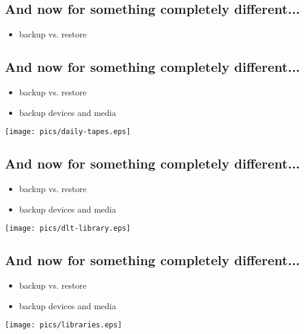 \documentclass[xga]{xdvislides}
\begin{document}
\subsection{And now for something completely different...}
\begin{itemize}
	\item backup vs. restore
\end{itemize}

\subsection{And now for something completely different...}
\begin{itemize}
	\item backup vs. restore
	\item backup devices and media
\end{itemize}
\vspace*{\fill}
\begin{center}
	\texttt{[image: pics/daily-tapes.eps]}
\end{center}
\vspace*{\fill}

\subsection{And now for something completely different...}
\begin{itemize}
	\item backup vs. restore
	\item backup devices and media
\end{itemize}
\vspace*{\fill}
\begin{center}
	\texttt{[image: pics/dlt-library.eps]}
\end{center}
\vspace*{\fill}

\subsection{And now for something completely different...}
\begin{itemize}
	\item backup vs. restore
	\item backup devices and media
\end{itemize}
\vspace*{\fill}
\begin{center}
	\texttt{[image: pics/libraries.eps]}
\end{center}
\vspace*{\fill}
\end{document}
